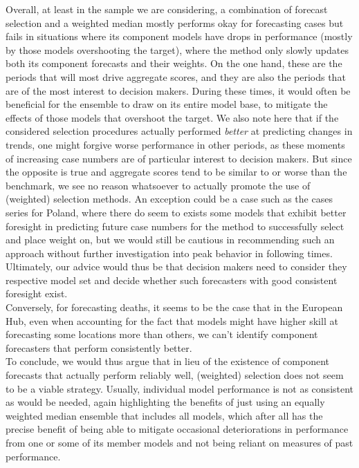 Overall, at least in the sample we are considering, a combination of forecast selection and a weighted median mostly performs okay for forecasting cases but fails in situations where its component models have drops in performance (mostly by those models overshooting the target), where the method only slowly updates both its component forecasts and their weights. On the one hand, these are the periods that will most drive aggregate scores, and they are also the periods that are of the most interest to decision makers. During these times, it would often be beneficial for the ensemble to draw on its entire model base, to mitigate the effects of those models that overshoot the target. We also note here that if the considered selection procedures actually performed \textit{better} at predicting changes in trends, one might forgive worse performance in other periods, as these moments of increasing case numbers are of particular interest to decision makers. But since the opposite is true and aggregate scores tend to be similar to or worse than the benchmark, we see no reason whatsoever to actually promote the use of (weighted) selection methods. An exception could be a case such as the cases series for Poland, where there do seem to exists some models that exhibit better foresight in predicting future case numbers for the method to successfully select and place weight on, but we would still be cautious in recommending such an approach without further investigation into peak behavior in following times. Ultimately, our advice would thus be that decision makers need to consider they respective model set and decide whether such forecasters with good consistent foresight exist.\\ 
Conversely, for forecasting deaths, it seems to be the case that in the European Hub, even when accounting for the fact that models might have higher skill at forecasting some locations more than others, we can't identify component forecasters that perform consistently better.\medskip\\ 
To conclude, we would thus argue that in lieu of the existence of component forecasts that actually perform reliably well, (weighted) selection does not seem to be a viable strategy. Usually, individual model performance is not as consistent as would be needed, again highlighting the benefits of just using an equally weighted median ensemble that includes all models, which after all has the precise benefit of being able to mitigate occasional deteriorations in performance from one or some of its member models and not being reliant on measures of past performance.\\
